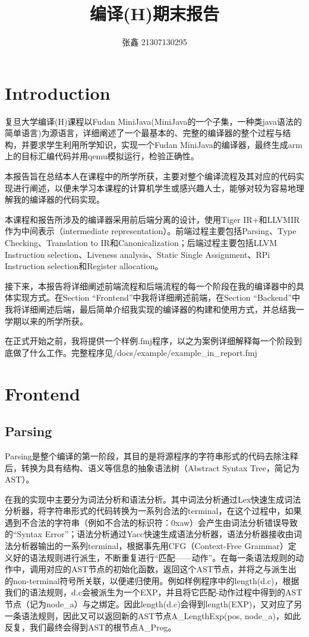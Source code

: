 \documentclass{article}
\title{ 编译(H)期末报告 }
\author{ 张鑫 21307130295}
\begin{document}
\maketitle

\section{Introduction}
复旦大学编译(H)课程以Fudan MiniJava(MiniJava的一个子集，一种类java语法的简单语言)为源语言，详细阐述了一个最基本的、完整的编译器的整个过程与结构，并要求学生利用所学知识，实现一个Fudan MiniJava的编译器，最终生成arm上的目标汇编代码并用qemu模拟运行，检验正确性。

本报告旨在总结本人在课程中的所学所获，主要对整个编译流程及其对应的代码实现进行阐述，以便未学习本课程的计算机学生或感兴趣人士，能够对较为容易地理解我的编译器的代码实现。

本课程和报告所涉及的编译器采用前后端分离的设计，使用Tiger IR+和LLVMIR作为中间表示（intermediate representation）。前端过程主要包括Parsing、Type Checking、Translation to IR和Canonicalization；后端过程主要包括LLVM Instruction selection、Liveness analysis、Static Single Assignment、RPi Instruction selection和Register allocation。

接下来，本报告将详细阐述前端流程和后端流程的每一个阶段在我的编译器中的具体实现方式。在Section “Frontend”中我将详细阐述前端，在Section “Backend”中我将详细阐述后端，最后简单介绍我实现的编译器的构建和使用方式，并总结我一学期以来的所学所获。

在正式开始之前，我将提供一个样例.fmj程序，以之为案例详细解释每一个阶段到底做了什么工作。完整程序见/docs/example/example\_in\_report.fmj

\section{Frontend}
\subsection{Parsing}
Parsing是整个编译的第一阶段，其目的是将源程序的字符串形式的代码去除注释后，转换为具有结构、语义等信息的抽象语法树（Abstract Syntax Tree，简记为AST）。

在我的实现中主要分为词法分析和语法分析。其中词法分析通过Lex快速生成词法分析器，将字符串形式的代码转换为一系列合法的terminal，在这个过程中，如果遇到不合法的字符串（例如不合法的标识符：0xaw）会产生由词法分析错误导致的“Syntax Error”；语法分析通过Yacc快速生成语法分析器，语法分析器接收由词法分析器输出的一系列terminal，根据事先用CFG（Context-Free Grammar）定义好的语法规则进行派生，不断重复进行“匹配——动作”。在每一条语法规则的动作中，调用对应的AST节点的初始化函数，返回这个AST节点，并将之与派生出的non-terminal符号所关联，以便递归使用。例如样例程序中的length(d.c)，根据我们的语法规则，d.c会被派生为一个EXP，并且将它匹配-动作过程中得到的AST节点（记为node\_a）与之绑定。因此length(d.c)会得到length(EXP)，又对应了另一条语法规则，因此又可以返回新的AST节点A\_LengthExp(pos, node\_a)，如此反复，我们最终会得到AST的根节点A\_Prog。
\end{document}
